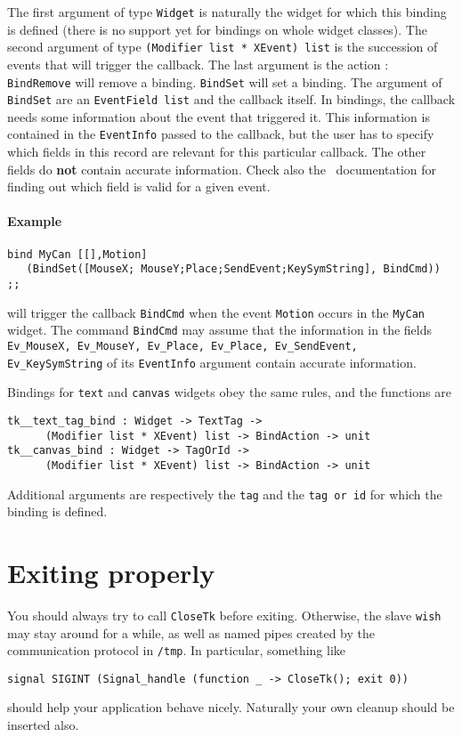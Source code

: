The first argument of type \verb|Widget| is naturally the widget for which
this binding is defined (there is no support yet for bindings on whole
widget classes).
The second argument of type \verb|(Modifier list * XEvent) list| is the 
succession of events that will trigger the callback.
The last argument is the action : \verb|BindRemove| will remove a binding.
\verb|BindSet| will set a binding.
The argument of \verb|BindSet| are an \verb|EventField list| and the
callback itself. 
In bindings, the callback needs some information about the event that
triggered it. This information is contained in the \verb|EventInfo| passed
to the callback, but the user has to specify which fields in this record are
relevant for this particular callback. The other fields do {\bf not} contain
accurate information. Check also the \tk\ documentation for finding out
which field is valid for a given event.

\paragraph{Example}
\begin{verbatim}
bind MyCan [[],Motion] 
   (BindSet([MouseX; MouseY;Place;SendEvent;KeySymString], BindCmd)) ;;
\end{verbatim} 
will trigger the callback \verb|BindCmd| when the event \verb|Motion| occurs
in the \verb|MyCan| widget. The command \verb|BindCmd| may assume that the 
information in the fields {\tt Ev\_MouseX, Ev\_MouseY, Ev\_Place, Ev\_Place,
Ev\_SendEvent, Ev\_KeySymString} of its \verb|EventInfo| argument contain
accurate information.

Bindings for \verb|text| and \verb|canvas| widgets obey the same rules,
and the functions are 
\begin{verbatim}
tk__text_tag_bind : Widget -> TextTag -> 
      (Modifier list * XEvent) list -> BindAction -> unit
tk__canvas_bind : Widget -> TagOrId -> 
      (Modifier list * XEvent) list -> BindAction -> unit
\end{verbatim} 
Additional arguments are respectively the {\tt tag} and the {\tt tag or id}
for which the binding is defined.

\section{Exiting properly}
You should always try to call \verb|CloseTk| before exiting. Otherwise, the
slave {\tt wish} may stay around for a while, as well as named pipes created
by the communication protocol in \verb|/tmp|. In particular, something like 
\begin{verbatim}
signal SIGINT (Signal_handle (function _ -> CloseTk(); exit 0))
\end{verbatim} 
should help your application behave nicely. Naturally your own cleanup
should be inserted also.

